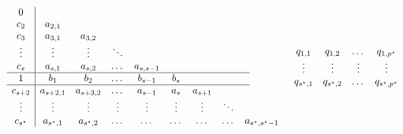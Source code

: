 \documentclass[../document.tex]{subfiles}
\begin{document}
				\begin{equation}
					\begin{array}{c|ccccccccc}
						0 & \multicolumn{9}{c}{}\\
						c_2 & a_{2,1} & \multicolumn{8}{c}{}\\
						c_3 & a_{3,1} & a_{3,2} & \multicolumn{7}{c}{}\\
						\vdots & \vdots & \vdots & \ddots & \multicolumn{6}{c}{}\\
						c_s & a_{s,1} & a_{s,2} & \dots & a_{s,s-1} & \multicolumn{5}{c}{}\\
						\hline
						1 & b_1 & b_2 & \dots & b_{s-1} & b_s & \multicolumn{4}{c}{}\\
						\hline
						c_{s+2} & a_{s+2,1} & a_{s+3,2} & \dots & a_{s-1} & a_{s} & a_{s + 1} & \multicolumn{3}{c}{}\\
						\vdots & \vdots & \vdots & \vdots & \vdots & \vdots & \vdots & \ddots & \multicolumn{2}{c}{}\\
						c_{s^{\star}} & a_{s^{\star},1} & a_{s^{\star},2} & \dots & \dots & \dots & \dots & \dots & a_{s^{\star},s^{\star}-1}
					\end{array}\qquad\qquad
					\begin{array}{cccc}
						q_{1,1} & q_{1,2} & \dots & q_{1,p^{\star}}\\
						\vdots & \vdots & \vdots & \vdots\\
						q_{s^{\star},1} & q_{s^{\star},2} & \dots & q_{s^{\star},p^{\star}}\\
					\end{array}
				\end{equation}
\end{document}
